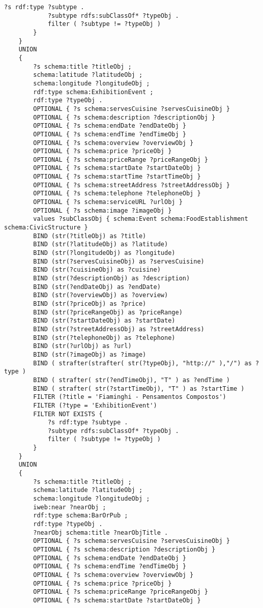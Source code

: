 \begin{lstlisting}[language=SPARQL,basicstyle=\ttfamily\small]
			?s rdf:type ?subtype .
			?subtype rdfs:subClassOf* ?typeObj .
			filter ( ?subtype != ?typeObj )
		}
	}
	UNION 
	{
		?s schema:title ?titleObj ;
		schema:latitude ?latitudeObj ;
		schema:longitude ?longitudeObj ;
		rdf:type schema:ExhibitionEvent ;
		rdf:type ?typeObj .
		OPTIONAL { ?s schema:servesCuisine ?servesCuisineObj }
		OPTIONAL { ?s schema:description ?descriptionObj }
		OPTIONAL { ?s schema:endDate ?endDateObj }
		OPTIONAL { ?s schema:endTime ?endTimeObj }	
		OPTIONAL { ?s schema:overview ?overviewObj }
		OPTIONAL { ?s schema:price ?priceObj }	
		OPTIONAL { ?s schema:priceRange ?priceRangeObj }
		OPTIONAL { ?s schema:startDate ?startDateObj }
		OPTIONAL { ?s schema:startTime ?startTimeObj }
		OPTIONAL { ?s schema:streetAddress ?streetAddressObj }	
		OPTIONAL { ?s schema:telephone ?telephoneObj }
		OPTIONAL { ?s schema:serviceURL ?urlObj }
		OPTIONAL { ?s schema:image ?imageObj }
		values ?subClassObj { schema:Event schema:FoodEstablishment schema:CivicStructure } 
		BIND (str(?titleObj) as ?title)
		BIND (str(?latitudeObj) as ?latitude)
		BIND (str(?longitudeObj) as ?longitude)
		BIND (str(?servesCuisineObj) as ?servesCuisine)
		BIND (str(?cuisineObj) as ?cuisine)
		BIND (str(?descriptionObj) as ?description)
		BIND (str(?endDateObj) as ?endDate)
		BIND (str(?overviewObj) as ?overview)
		BIND (str(?priceObj) as ?price)
		BIND (str(?priceRangeObj) as ?priceRange)
		BIND (str(?startDateObj) as ?startDate)
		BIND (str(?streetAddressObj) as ?streetAddress)
		BIND (str(?telephoneObj) as ?telephone)
		BIND (str(?urlObj) as ?url)
		BIND (str(?imageObj) as ?image)
		BIND ( strafter(strafter( str(?typeObj), "http://" ),"/") as ?type )
		BIND ( strafter( str(?endTimeObj), "T" ) as ?endTime )
		BIND ( strafter( str(?startTimeObj), "T" ) as ?startTime )
		FILTER (?title = 'Fiaminghi - Pensamentos Compostos')
		FILTER (?type = 'ExhibitionEvent')
		FILTER NOT EXISTS {
			?s rdf:type ?subtype .
			?subtype rdfs:subClassOf* ?typeObj .
			filter ( ?subtype != ?typeObj )
		}
	}
	UNION 
	{
		?s schema:title ?titleObj ;
		schema:latitude ?latitudeObj ;
		schema:longitude ?longitudeObj ;
		iweb:near ?nearObj ; 
		rdf:type schema:BarOrPub ;
		rdf:type ?typeObj .
		?nearObj schema:title ?nearObjTitle .
		OPTIONAL { ?s schema:servesCuisine ?servesCuisineObj }
		OPTIONAL { ?s schema:description ?descriptionObj }
		OPTIONAL { ?s schema:endDate ?endDateObj }
		OPTIONAL { ?s schema:endTime ?endTimeObj }	
		OPTIONAL { ?s schema:overview ?overviewObj }
		OPTIONAL { ?s schema:price ?priceObj }	
		OPTIONAL { ?s schema:priceRange ?priceRangeObj }
		OPTIONAL { ?s schema:startDate ?startDateObj }

\end{lstlisting}
